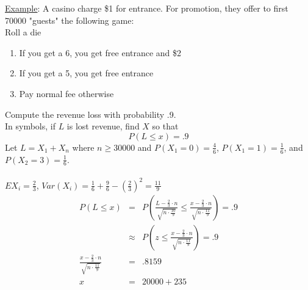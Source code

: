   \underline{Example}: A casino charge \$1 for entrance. For promotion, they
  offer to first 70000 "guests" the following game:\\
  Roll a die
    \begin{enumerate}
      \item If you get a 6, you get free entrance and \$2
      \item If you get a 5, you get free entrance
      \item Pay normal fee otherwise
    \end{enumerate}
  Compute the revenue loss with probability .9.\\
  In symbols, if $L$ is lost revenue, find $X$ so that
  $$
    P(L \le x) = .9
  $$
  Let $L = X_1 + X_n$ where $n \ge 30000$ and $P(X_1 = 0) = \frac{4}{6}$,
  $P(X_1 = 1) = \frac{1}{6}$, and $P(X_2 = 3) = \frac{1}{6}$.\\\\
  $EX_i = \frac{2}{3}$, $Var(X_i) = \frac{1}{6} + \frac{9}{6} - \left(\frac{2}
  {3}\right)^2 = \frac{11}{9}$\\
  \begin{eqnarray*}
    P(L \le x) & = & P\left( \frac{L - \frac{2}{3} \cdot n}{\sqrt{n \cdot 
    \frac{10}{9}}} \le \frac{x - \frac{2}{3}\cdot n}{\sqrt{n \cdot \frac{11}{9}
    }}\right) = .9\\
    & \approx & P\left(z \le \frac{x - \frac{2}{3} \cdot n}{\sqrt{n \cdot 
    \frac{11}{9}}}\right) = .9\\
    \frac{x - \frac{2}{3} \cdot n}{\sqrt{n \cdot \frac{11}{9}}} & = & .8159\\
    x & = & 20000 + 235\\
  \end{eqnarray*}
